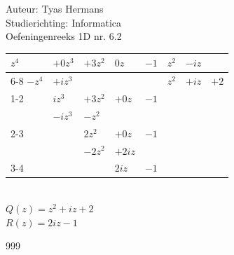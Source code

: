 \documentclass[a4paper]{article}
\begin{document}
  
\noindent \large Auteur: Tyas Hermans \\
\noindent \large Studierichting: Informatica\\
\noindent \large Oefeningenreeks 1D nr. 6.2\\

\medskip

\normalsize

\begin{tabular}{lllll|lll}				 \\
$z^4$ & $+0z^3$ & $+3z^2$ & $0z$ & $-1$ & $z^2$ & $-iz$ &\\ \cline{6-8}
$-z^4$ & $+iz^3$ & & & & $z^2$ & $+iz$ & $+2$ \\ \cline{1-2}
& $iz^3$ & $+3z^2$ & $+0z$ & $-1$ \\
& $-iz^3$ & $-z^2$ & & & & \\ \cline{2-3}
& & $2z^2$ & $+0z$ & $-1$ & \\
& & $-2z^2$ & $+2iz$ & & & \\ \cline{3-4}
& & & $2iz$ & $-1$ &			\\
\end{tabular}              \\

$Q(z) = z^2+iz+2$	\\

$R(z) = 2iz - 1$\\



\begin{thebibliography}{999}
\end{thebibliography}
\end{document}
